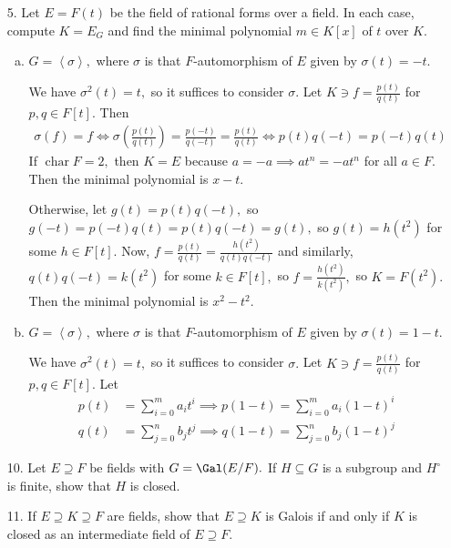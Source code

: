 \documentclass{article}
\DeclareMathOperator{\cha}{char}
\begin{document}
\begin{itemize}
	\item[5.] Let $E=F(t)$ be the field of rational forms over a field. In each case, compute $K=E_G$ and find the minimal polynomial $m\in K[x]$ of $t$ over $K.$
		\begin{enumerate}[(a)]
			\item $G=\left< \sigma\right>,$ where $\sigma$ is that $F$-automorphism of $E$ given by $\sigma(t)=-t.$
				\begin{soln}
					We have $\sigma^2(t)=t,$ so it suffices to consider $\sigma.$ Let $K\ni f = \frac{p(t)}{q(t)}$ for $p, q\in F[t].$ Then
					\begin{align*}
						\sigma(f) = f \iff \sigma\left( \frac{p(t)}{q(t)} \right) = \frac{p(-t)}{q(-t)} = \frac{p(t)}{q(t)} \iff p(t)q(-t) = p(-t)q(t)
					\end{align*}
					If $\cha F=2,$ then $K=E$ because $a=-a\implies at^n=-at^n$ for all $a\in F.$ Then the minimal polynomial is $x-t.$
					
					Otherwise, let $g(t) = p(t)q(-t),$ so $g(-t)=p(-t)q(t) = p(t)q(-t) = g(t),$ so $g(t) = h(t^2)$ for some $h\in F[t].$ Now, $f=\frac{p(t)}{q(t)} = \frac{h(t^2)}{q(t)q(-t)}$ and similarly, $q(t)q(-t)=k(t^2)$ for some $k\in F[t],$ so $f=\frac{h(t^2)}{k(t^2)},$ so $K=F(t^2).$ Then the minimal polynomial is $x^2-t^2.$
				\end{soln}

			\item $G=\left< \sigma\right>,$ where $\sigma$ is that $F$-automorphism of $E$ given by $\sigma(t)=1-t.$
				\begin{soln}
					We have $\sigma^2(t)=t,$ so it suffices to consider $\sigma.$ Let $K\ni f=\frac{p(t)}{q(t)}$ for $p, q\in F[t].$ Let 
					\begin{align*}
						p(t) &= \sum_{i=0}^{m} a_i t^i \implies p(1-t) = \sum_{i=0}^{m} a_i (1-t)^i \\
						q(t) &= \sum_{j=0}^{n} b_j t^j \implies q(1-t) = \sum_{j=0}^{n} b_j (1-t)^j
					\end{align*}
				\end{soln}
				
		\end{enumerate}

	\item[10.] Let $E\supseteq F$ be fields with $G=\Gal(E/F).$ If $H\subseteq G$ is a subgroup and $H^\circ$ is finite, show that $H$ is closed.

	\item[11.] If $E\supseteq K\supseteq F$ are fields, show that $E\supseteq K$ is Galois if and only if $K$ is closed as an intermediate field of $E\supseteq F.$
		
\end{itemize}
\end{document}
